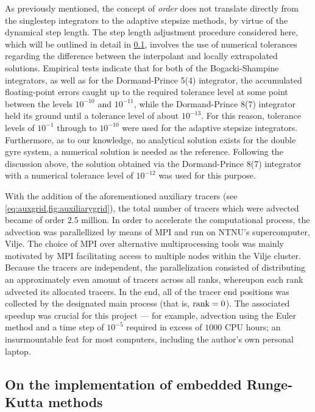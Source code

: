 As previously mentioned, the concept of \emph{order} does not translate
directly from the singlestep integrators to the adaptive stepsize methods, by
virtue of the dynamical step length. The step length adjustment procedure
considered here, which will be outlined in detail in
\cref{sub:on_the_implementation_of_embedded_runge_kutta_methods}, involves
the use of numerical tolerances regarding the difference between the interpolant
and locally extrapolated solutions. Empirical tests indicate that for both of the
Bogacki-Shampine integrators, as well as for the Dormand-Prince 5(4) integrator,
the accumulated floating-point errors caught up to the required tolerance level
at some point between the levels $10^{-10}$ and $10^{-11}$, while the
Dormand-Prince 8(7) integrator held its ground until a tolerance level of about
$10^{-13}$. For this reason, tolerance levels of $10^{-1}$ through to $10^{-10}$
were used for the adaptive stepsize integrators. Furthermore, as to our
knowledge, no analytical solution exists for the double gyre system, a numerical
solution is needed as the reference. Following the discussion above, the
solution obtained via the Dormand-Prince 8(7) integrator with a numerical
tolerance level of $10^{-12}$ was used for this purpose.

With the addition of the aforementioned auxiliary tracers (see
\cref{eq:auxgrid,fig:auxiliarygrid}), the total number of tracers which were
advected became of order $2.5$ million. In order to accelerate the computational
process, the advection was parallellized by means of MPI and run on NTNU's
supercomputer, Vilje. The choice of MPI over alternative multiprocessing tools
was mainly motivated by MPI facilitating access to multiple nodes within the
Vilje cluster. Because the tracers are independent, the parallelization
consisted of distributing an approximately even amount of tracers across all
ranks, whereupon each rank advected its allocated tracers. In the end, all of
the tracer end positions was collected by the designated main process
(that is, $\textnormal{rank}=0$). The associated speedup was crucial for this
project --- for example, advection using the Euler method and a time step of
$10^{-5}$ required in excess of $1000$ CPU hours; an insurmountable feat for
most computers, including the author's own personal laptop.
\clearpage
\subsection{On the implementation of embedded Runge-Kutta methods}
\label{sub:on_the_implementation_of_embedded_runge_kutta_methods}

